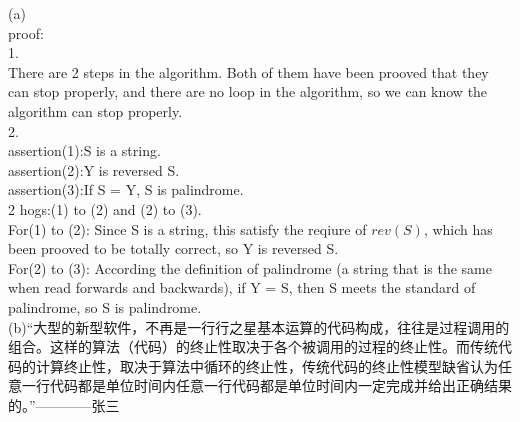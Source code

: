 \documentclass[a4paper, justified]{tufte-handout}
\begin{document}
\begin{solution}
\end{solution}

\begin{problem}
\end{problem}

\begin{solution}
  (a)\\
  proof:\\
  1.\\
  There are 2 steps in the algorithm. Both of them have been prooved that they can stop properly, and there are no loop in the algorithm, so we can know the algorithm can stop properly.\\
  2.\\
  assertion(1):S is a string.\\
  assertion(2):Y is reversed S.\\
  assertion(3):If S = Y, S is palindrome.\\
  2 hogs:(1) to (2) and (2) to (3).\\
  For(1) to (2): Since S is a string, this satisfy the reqiure of $rev(S)$, which has been prooved to be totally correct, so Y is reversed S.\\
  For(2) to (3): According the definition of palindrome (a string that is the same when read forwards and backwards), if Y = S, then S meets the standard of palindrome, so S is palindrome.\\
  (b)“大型的新型软件，不再是一行行之星基本运算的代码构成，往往是过程调用的组合。这样的算法（代码）的终止性取决于各个被调用的过程的终止性。而传统代码的计算终止性，取决于算法中循环的终止性，传统代码的终止性模型缺省认为任意一行代码都是单位时间内任意一行代码都是单位时间内一定完成并给出正确结果的。”————张三
\end{solution}

\begin{problem}
\end{problem}
\end{document}
